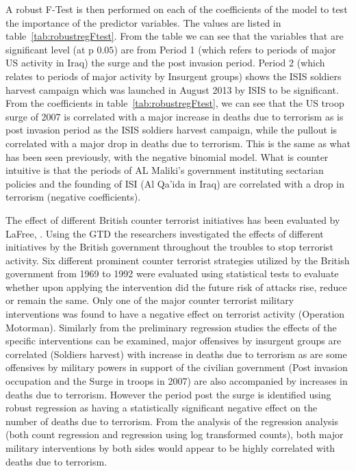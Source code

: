 A robust F-Test is then performed on each of the coefficients of the model to test the importance of the predictor variables. The values are listed in table~\ref{tab:robustregFtest}. From the table we can see that the variables that are significant level (at p $0.05$) are from Period 1 (which refers to periods of major US activity in Iraq) the surge and the post invasion period.  Period 2 (which relates  to periods of major activity by Insurgent groups) shows the ISIS soldiers harvest  campaign which was launched in August 2013 by ISIS to be significant. From the coefficients in table~\ref{tab:robustregFtest}, we can see that the US troop surge of 2007 is correlated with a major increase in  deaths due to terrorism as is post invasion period as the ISIS soldiers harvest campaign, while the pullout is correlated with a major drop in deaths due to terrorism. This is the same as what has been seen previously, with the negative binomial model. What is counter intuitive is that the periods of AL Maliki's government instituting sectarian policies and the founding of ISI (Al Qa'ida in Iraq) are correlated with a drop in terrorism (negative coefficients). 

The effect of different British counter terrorist initiatives has been evaluated by LaFree, \citep{lafree2009impact}. Using the GTD the researchers investigated the effects of different initiatives by the British government throughout the troubles to stop terrorist activity. Six different prominent counter terrorist strategies utilized by the British government from 1969 to 1992 were evaluated using statistical tests to evaluate whether upon applying the intervention did the future risk of attacks rise, reduce or remain the same. Only one of the major counter terrorist military interventions was found to have a negative effect on terrorist activity (Operation Motorman). Similarly from the preliminary regression studies the effects of the specific interventions can be examined, major offensives by insurgent groups are correlated (Soldiers harvest) with increase in deaths due to terrorism as are some offensives by military powers in support of the civilian government (Post invasion occupation and the Surge in troops in 2007) are also accompanied by increases in deaths due to terrorism. However the period post the surge is identified using robust regression as having a statistically significant negative effect on the number of deaths due to terrorism. From the analysis of the regression analysis (both count regression and regression using log transformed counts), both major military interventions by both sides would appear to be highly correlated with deaths due to terrorism. 

